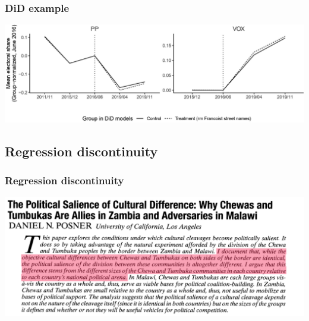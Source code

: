 \documentclass[aspectratio=43]{beamer}
\begin{document}
\begin{frame}
\frametitle{DiD example}
\centering

\includegraphics[width = \textwidth]{../img/did_TJ}

\end{frame}

\subsection*{Regression discontinuity}

\begin{frame}
\frametitle{Regression discontinuity}
\centering

\includegraphics[width = \textwidth]{../img/posner1}

\end{frame}
\end{document}
